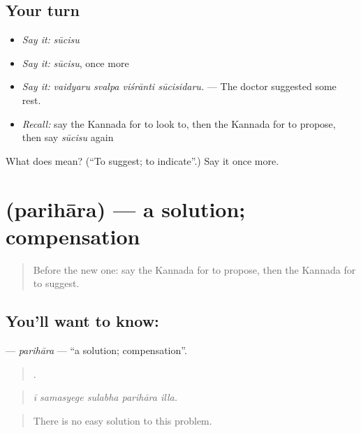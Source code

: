 \subsection*{Your turn}
\begin{itemize}
\raggedright
  \item \emph{Say it:} \emph{sūcisu}
  \item \emph{Say it:} \emph{sūcisu}, once more
  \item \emph{Say it:} \emph{vaidyaru svalpa viśrānti sūcisidaru.} — The doctor suggested some rest.
  \item \emph{Recall:} say the Kannada for to look to, then the Kannada for to propose, then say \emph{sūcisu} again
\end{itemize}

\begin{tcolorbox}[breakable,colback=teal!4,colframe=teal!35!black,title={Before you move on}]
What does  mean? (\textquotedblleft{}To suggest; to indicate\textquotedblright{}.) Say it once more.
\end{tcolorbox}
\section[\texorpdfstring{\kn{ಪರಿಹಾರ} (parihāra)}{ಪರಿಹಾರ (parihāra)}]{ (parihāra) — a solution; compensation}

\label{lesson:KA-C429-parihara}



\begin{quote}
Before the new one: say the Kannada for to propose, then the Kannada for to suggest.
\end{quote}

\subsection*{You'll want to know: }
\textbf{} — \emph{parihāra} — \textquotedblleft{}a solution; compensation\textquotedblright{}.

\begin{quote}
    .
\end{quote}

\begin{quote}
\emph{ī samasyege sulabha parihāra illa.}
\end{quote}

\begin{quote}
There is no easy solution to this problem.
\end{quote}

